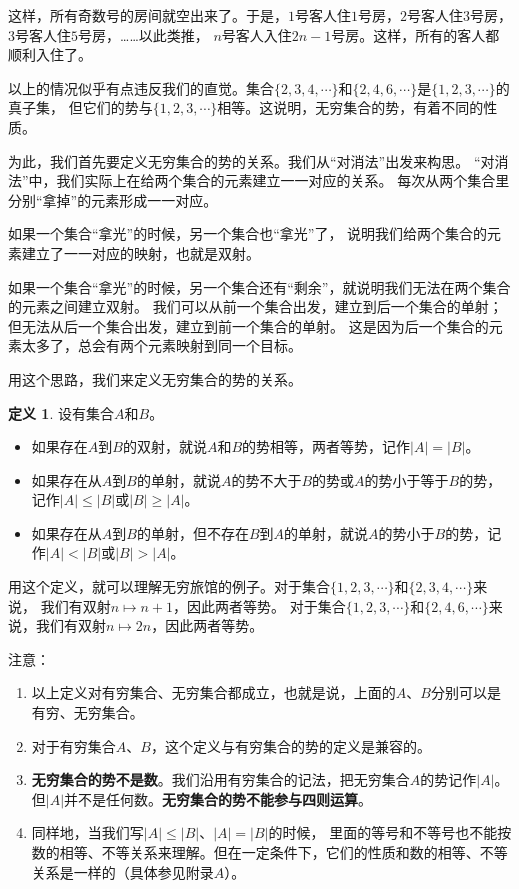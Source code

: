 \documentclass[12pt,UTF8]{ctexbook}
\theoremstyle{definition}
\newtheorem{df}{定义}[section]
\theoremstyle{plain}
\begin{document}
这样，所有奇数号的房间就空出来了。于是，$1$号客人住$1$号房，$2$号客人住$3$号房，$3$号客人住$5$号房，……以此类推，
$n$号客人入住$2n-1$号房。这样，所有的客人都顺利入住了。

以上的情况似乎有点违反我们的直觉。集合$\{2,3,4,\cdots\}$和$\{2,4,6,\cdots\}$是$\{1,2,3,\cdots\}$的真子集，
但它们的势与$\{1,2,3,\cdots\}$相等。这说明，无穷集合的势，有着不同的性质。

为此，我们首先要定义无穷集合的势的关系。我们从“对消法”出发来构思。
“对消法”中，我们实际上在给两个集合的元素建立一一对应的关系。
每次从两个集合里分别“拿掉”的元素形成一一对应。

如果一个集合“拿光”的时候，另一个集合也“拿光”了，
说明我们给两个集合的元素建立了一一对应的映射，也就是双射。

如果一个集合“拿光”的时候，另一个集合还有“剩余”，就说明我们无法在两个集合的元素之间建立双射。
我们可以从前一个集合出发，建立到后一个集合的单射；但无法从后一个集合出发，建立到前一个集合的单射。
这是因为后一个集合的元素太多了，总会有两个元素映射到同一个目标。

用这个思路，我们来定义无穷集合的势的关系。

\begin{df}\label{df:1-0-0}
    设有集合$A$和$B$。
    \begin{itemize}
        \item 如果存在$A$到$B$的双射，就说$A$和$B$的势相等，两者等势，记作$|A| = |B|$。
        \item 如果存在从$A$到$B$的单射，就说$A$的势不大于$B$的势或$A$的势小于等于$B$的势，记作$|A| \leqslant |B|$或$|B| \geqslant |A|$。
        \item 如果存在从$A$到$B$的单射，但不存在$B$到$A$的单射，就说$A$的势小于$B$的势，记作$|A| < |B|$或$|B| > |A|$。
    \end{itemize}
\end{df}

用这个定义，就可以理解无穷旅馆的例子。对于集合$\{1,2,3,\cdots\}$和$\{2,3,4,\cdots\}$来说，
我们有双射$n\mapsto n+1$，因此两者等势。
对于集合$\{1,2,3,\cdots\}$和$\{2,4,6,\cdots\}$来说，我们有双射$n\mapsto 2n$，因此两者等势。

注意：
\begin{enumerate}
    \item 以上定义对有穷集合、无穷集合都成立，也就是说，上面的$A$、$B$分别可以是有穷、无穷集合。
    \item 对于有穷集合$A$、$B$，这个定义与有穷集合的势的定义是兼容的。
    \item \textbf{无穷集合的势不是数}。我们沿用有穷集合的记法，把无穷集合$A$的势记作$|A|$。
    但$|A|$并不是任何数。\textbf{无穷集合的势不能参与四则运算}。
    \item 同样地，当我们写$|A| \leqslant |B|$、$|A| = |B|$的时候，
    里面的等号和不等号也不能按数的相等、不等关系来理解。但在一定条件下，它们的性质和数的相等、不等关系是一样的（具体参见附录$A$）。
\end{enumerate}
\end{document}
